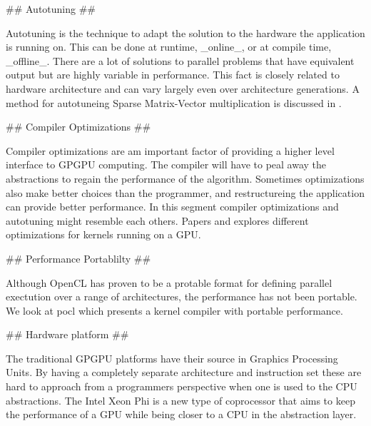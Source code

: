 \begin{markdown}
## Autotuning ##

Autotuning is the technique to adapt the solution to the hardware the
application is running on. This can be done at runtime, _online_, or
at compile time, _offline_. There are a lot of solutions to parallel
problems that have equivalent output but are highly variable in
performance. This fact is closely related to hardware architecture and
can vary largely even over architecture generations. A method for
autotuneing Sparse Matrix-Vector multiplication is discussed in
\cite{auto}.

## Compiler Optimizations ##

Compiler optimizations are am important factor of providing a higher
level interface to GPGPU computing. The compiler will have to peal
away the abstractions to regain the performance of the
algorithm. Sometimes optimizations also make better choices than
the programmer, and restructureing the application can provide better
performance. In this segment compiler optimizations and autotuning
might resemble each others. Papers \cite{thd-coa} and \cite{mem-acc}
explores different optimizations for kernels running on a GPU.  

## Performance Portablilty ##

Although OpenCL has proven to be a protable format for defining
parallel exectution over a range of architectures, the performance has
not been portable. We look at pocl \cite{pocl} which presents a kernel
compiler with portable performance.

## Hardware platform ##

The traditional GPGPU platforms have their source in Graphics
Processing Units. By having a completely separate architecture and
instruction set these are hard to approach from a programmers
perspective when one is used to the CPU abstractions. The Intel Xeon
Phi \cite{phi} is a new type of coprocessor that aims to keep the
performance of a GPU while being closer to a CPU in the abstraction layer.



\end{markdown}


